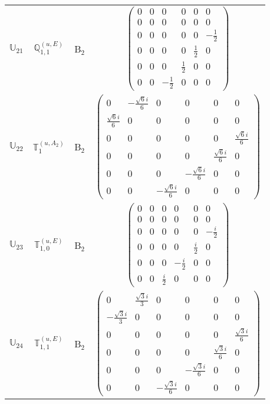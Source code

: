 \documentclass[fleqn,10pt,landscape]{article}
\begin{document}
\begin{itemize}
\begin{center}
\begin{longtable}{c|c|c|c}
$ \mathbb{U}_{21} $ & $\mathbb{Q}_{1,1}^{(u,E)}$ & B$_{2}$ & $\begin{pmatrix} 0 & 0 & 0 & 0 & 0 & 0 \\ 0 & 0 & 0 & 0 & 0 & 0 \\ 0 & 0 & 0 & 0 & 0 & - \frac{1}{2} \\ 0 & 0 & 0 & 0 & \frac{1}{2} & 0 \\ 0 & 0 & 0 & \frac{1}{2} & 0 & 0 \\ 0 & 0 & - \frac{1}{2} & 0 & 0 & 0 \end{pmatrix}$ \\
$ \mathbb{U}_{22} $ & $\mathbb{T}_{1}^{(u,A_{2})}$ & B$_{2}$ & $\begin{pmatrix} 0 & - \frac{\sqrt{6} i}{6} & 0 & 0 & 0 & 0 \\ \frac{\sqrt{6} i}{6} & 0 & 0 & 0 & 0 & 0 \\ 0 & 0 & 0 & 0 & 0 & \frac{\sqrt{6} i}{6} \\ 0 & 0 & 0 & 0 & \frac{\sqrt{6} i}{6} & 0 \\ 0 & 0 & 0 & - \frac{\sqrt{6} i}{6} & 0 & 0 \\ 0 & 0 & - \frac{\sqrt{6} i}{6} & 0 & 0 & 0 \end{pmatrix}$ \\
$ \mathbb{U}_{23} $ & $\mathbb{T}_{1,0}^{(u,E)}$ & B$_{2}$ & $\begin{pmatrix} 0 & 0 & 0 & 0 & 0 & 0 \\ 0 & 0 & 0 & 0 & 0 & 0 \\ 0 & 0 & 0 & 0 & 0 & - \frac{i}{2} \\ 0 & 0 & 0 & 0 & \frac{i}{2} & 0 \\ 0 & 0 & 0 & - \frac{i}{2} & 0 & 0 \\ 0 & 0 & \frac{i}{2} & 0 & 0 & 0 \end{pmatrix}$ \\
$ \mathbb{U}_{24} $ & $\mathbb{T}_{1,1}^{(u,E)}$ & B$_{2}$ & $\begin{pmatrix} 0 & \frac{\sqrt{3} i}{3} & 0 & 0 & 0 & 0 \\ - \frac{\sqrt{3} i}{3} & 0 & 0 & 0 & 0 & 0 \\ 0 & 0 & 0 & 0 & 0 & \frac{\sqrt{3} i}{6} \\ 0 & 0 & 0 & 0 & \frac{\sqrt{3} i}{6} & 0 \\ 0 & 0 & 0 & - \frac{\sqrt{3} i}{6} & 0 & 0 \\ 0 & 0 & - \frac{\sqrt{3} i}{6} & 0 & 0 & 0 \end{pmatrix}$ \\
\end{longtable}
\end{center}


\end{itemize}
\end{document}
